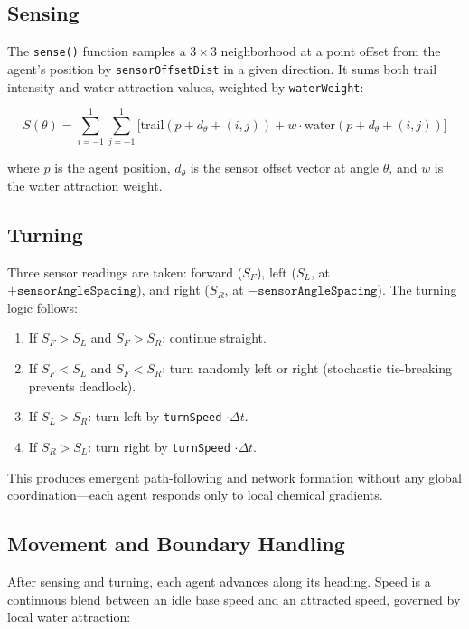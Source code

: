 \documentclass[12pt, titlepage]{article}
\begin{document}
\subsection{Sensing}

The \texttt{sense()} function samples a $3 \times 3$ neighborhood at a point
offset from the agent's position by \texttt{sensorOffsetDist} in a given
direction. It sums both trail intensity and water attraction values, weighted by
\texttt{waterWeight}:

\begin{equation}
    S(\theta) = \sum_{i=-1}^{1}\sum_{j=-1}^{1}
    \Big[\text{trail}(p + d_\theta + (i,j)) +
    w \cdot \text{water}(p + d_\theta + (i,j))\Big]
\end{equation}

where $p$ is the agent position, $d_\theta$ is the sensor offset vector at
angle $\theta$, and $w$ is the water attraction weight.

\subsection{Turning}

Three sensor readings are taken: forward ($S_F$), left ($S_L$, at
$+\texttt{sensorAngleSpacing}$), and right ($S_R$, at
$-\texttt{sensorAngleSpacing}$). The turning logic follows:

\begin{enumerate}
    \item If $S_F > S_L$ and $S_F > S_R$: continue straight.
    \item If $S_F < S_L$ and $S_F < S_R$: turn randomly left or right
    (stochastic tie-breaking prevents deadlock).
    \item If $S_L > S_R$: turn left by \texttt{turnSpeed} $\cdot \Delta t$.
    \item If $S_R > S_L$: turn right by \texttt{turnSpeed} $\cdot \Delta t$.
\end{enumerate}

This produces emergent path-following and network formation without any global
coordination---each agent responds only to local chemical gradients.

\subsection{Movement and Boundary Handling}

After sensing and turning, each agent advances along its heading. Speed is
a continuous blend between an idle base speed and an attracted speed, governed
by local water attraction:
\end{document}
